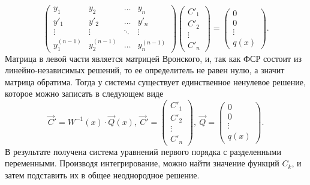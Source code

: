     \[
        \begin{pmatrix}
            y_1 & y_2 & \dots & y_n \\
            y'_1 & y'_2 & \dots & y'_n \\
            \vdots & \vdots & \ddots & \vdots \\
            y^{(n - 1)}_1 & y^{(n - 1)}_2 & \dots & y^{(n - 1)}_n
        \end{pmatrix}
        \begin{pmatrix}
            C'_1 \\ C'_2 \\ \vdots \\ C'_n
        \end{pmatrix}
        =
        \begin{pmatrix}
            0 \\ 0 \\ \vdots \\ q(x)
        \end{pmatrix}.
    \]
    Матрица в левой части является матрицей Вронского, и, так как ФСР состоит из линейно-независимых решений, то ее определитель не равен нулю, а значит матрица обратима. Тогда у системы существует единственное ненулевое решение, которое можно записать в следующем виде
    \[
        \vec{C}' = W^{-1}(x) \cdot \vec{Q}(x), ~ \vec{C}' =
        \begin{pmatrix}
            C'_1 \\ C'_2 \\ \vdots \\ C'_n
        \end{pmatrix}, ~
        \vec{Q} =
        \begin{pmatrix}
            0 \\ 0 \\ \vdots \\ q(x)
        \end{pmatrix}.
    \]
    В результате получена система уравнений первого порядка с разделенными переменными. Производя интегрирование, можно найти значение функций $ C_k $, и затем подставить их в общее неоднородное решение.

